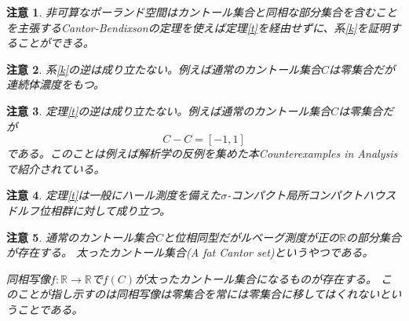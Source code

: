 \documentclass[leqno]{jsarticle}
\newtheorem*{cau}{注意}
\newcommand{\rr}{\mathbb{R}}
\begin{document}
\begin{cau}
非可算なポーランド空間はカントール集合と同相な部分集合を含むことを主張するCantor-Bendixsonの定理を使えば定理\ref{t}を経由せずに、系\ref{k}を証明することができる。
\end{cau}
\begin{cau}
系\ref{k}の逆は成り立たない。例えば通常のカントール集合$C$は零集合だが連続体濃度をもつ。
\end{cau}
\begin{cau}
定理\ref{t}の逆は成り立たない。例えば通常のカントール集合$C$は零集合だが
\[
C-C=[-1,1]
\]
である。このことは例えば解析学の反例を集めた本Counterexamples in Analysis で紹介されている。
\end{cau}
\begin{cau}
定理\ref{t}は一般にハール測度を備えた$\sigma$-コンパクト局所コンパクトハウスドルフ位相群に対して成り立つ。
\end{cau}
\begin{cau}
通常のカントール集合$C$と位相同型だがルベーグ測度が正の$\rr$の部分集合が存在する。
太ったカントール集合(A fat Cantor set)というやつである。\par
同相写像$f:\rr\to \rr$で$f(C)$が太ったカントール集合になるものが存在する。
このことが指し示すのは同相写像は零集合を常には零集合に移してはくれないということである。
\end{cau}








			
\end{document}
